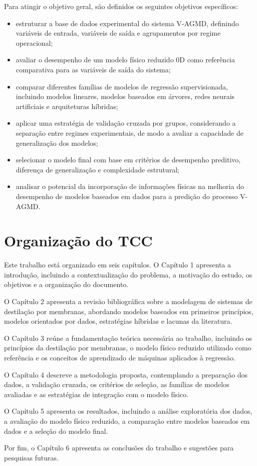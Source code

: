 Para atingir o objetivo geral, são definidos os seguintes objetivos específicos:

\begin{itemize}
    \item estruturar a base de dados experimental do sistema V-AGMD, definindo variáveis de entrada, variáveis de saída e agrupamentos por regime operacional;

    \item avaliar o desempenho de um modelo físico reduzido 0D como referência comparativa para as variáveis de saída do sistema;

    \item comparar diferentes famílias de modelos de regressão supervisionada, incluindo modelos lineares, modelos baseados em árvores, redes neurais artificiais e arquiteturas híbridas;

    \item aplicar uma estratégia de validação cruzada por grupos, considerando a separação entre regimes experimentais, de modo a avaliar a capacidade de generalização dos modelos;

    \item selecionar o modelo final com base em critérios de desempenho preditivo, diferença de generalização e complexidade estrutural;

    \item analisar o potencial da incorporação de informações físicas na melhoria do desempenho de modelos baseados em dados para a predição do processo V-AGMD.
\end{itemize}

\section{Organização do TCC}

Este trabalho está organizado em seis capítulos. O Capítulo 1 apresenta a introdução, incluindo a contextualização do problema, a motivação do estudo, os objetivos e a organização do documento.

O Capítulo 2 apresenta a revisão bibliográfica sobre a modelagem de sistemas de destilação por membranas, abordando modelos baseados em primeiros princípios, modelos orientados por dados, estratégias híbridas e lacunas da literatura.

O Capítulo 3 reúne a fundamentação teórica necessária ao trabalho, incluindo os princípios da destilação por membranas, o modelo físico reduzido utilizado como referência e os conceitos de aprendizado de máquinas aplicados à regressão.

O Capítulo 4 descreve a metodologia proposta, contemplando a preparação dos dados, a validação cruzada, os critérios de seleção, as famílias de modelos avaliadas e as estratégias de integração com o modelo físico.

O Capítulo 5 apresenta os resultados, incluindo a análise exploratória dos dados, a avaliação do modelo físico reduzido, a comparação entre modelos baseados em dados e a seleção do modelo final.

Por fim, o Capítulo 6 apresenta as conclusões do trabalho e sugestões para pesquisas futuras.